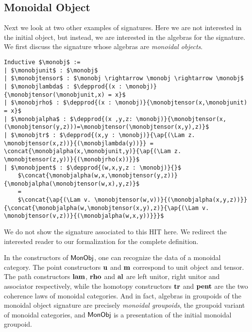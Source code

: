 \subsection{Monoidal Object}
\label{sec:monoidal_object}
Next we look at two other examples of signatures.
Here we are not interested in the initial object, but instead, we are interested in the algebras for the signature.
We first discuss the signature whose algebras are \emph{monoidal objects}.
\begin{lstlisting}[mathescape=true]
Inductive $\monobj$ :=
| $\monobjunit$ : $\monobj$
| $\monobjtensor$ : $\monobj \rightarrow \monobj \rightarrow \monobj$
| $\monobjlambda$ : $\depprod{(x : \monobj)}{\monobjtensor(\monobjunit,x) = x}$
| $\monobjrho$ : $\depprod{(x : \monobj)}{\monobjtensor(x,\monobjunit) = x}$
| $\monobjalpha$ : $\depprod{(x ,y,z: \monobj)}{\monobjtensor(x,(\monobjtensor(y,z)))=\monobjtensor(\monobjtensor(x,y),z)}$
| $\monobjtr$ : $\depprod{(x,y : \monobj)}{\ap{(\Lam z. \monobjtensor(x,z))}{(\monobjlambda(y))}} = \concat{\monobjalpha(x,\monobjunit,y)}{\ap{(\Lam z. \monobjtensor(z,y))}{(\monobjrho(x))}}$
| $\monobjpent$ : $\depprod{(w,x,y,z : \monobj)}{}$
    $\concat{\monobjalpha(w,x,\monobjtensor(y,z))}{\monobjalpha(\monobjtensor(w,x),y,z)}$
    =
    $\concat{\ap{(\Lam v. \monobjtensor(w,v))}{(\monobjalpha(x,y,z))}}{\concat{\monobjalpha(w,\monobjtensor(x,y),z)}{\ap{(\Lam v. \monobjtensor(v,z))}{(\monobjalpha(w,x,y))}}}$
\end{lstlisting}
We do not show the signature associated to this HIT here. We redirect
the interested reader to our formalization for the complete
definition.

In the constructors of $\mathsf{MonObj}$, one can recognize the data of a
monoidal category. The point constructors $\operatorname{\mathbf{u}}$ and
$\operatorname{\mathbf{m}}$ correspond to unit object and tensor. The path
constructors $\operatorname{\mathbf{lam}}$, $\operatorname{\mathbf{rho}}$ and $\operatorname{\mathbf{al}}$ are left
unitor, right unitor and associator respectively, while the homotopy constructors
$\operatorname{\mathbf{tr}}$ and $\operatorname{\mathbf{pent}}$ are the two coherence laws of
monoidal categories. And in fact, algebras in groupoids of the
monoidal object signature are precisely
\emph{monoidal groupoids}, the groupoid variant of monoidal
categories, and $\mathsf{MonObj}$ is a presentation of the initial
monoidal groupoid.


